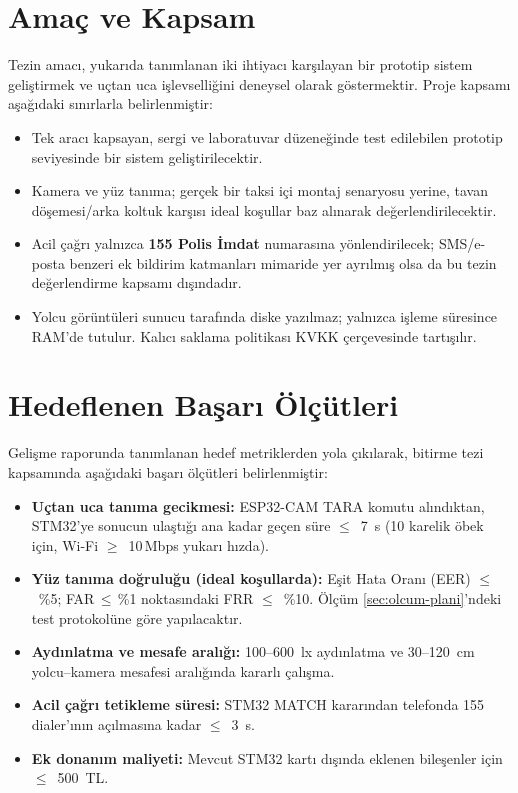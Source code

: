 \section{Amaç ve Kapsam}

Tezin amacı, yukarıda tanımlanan iki ihtiyacı karşılayan bir prototip
sistem geliştirmek ve uçtan uca işlevselliğini deneysel olarak
göstermektir. Proje kapsamı aşağıdaki sınırlarla belirlenmiştir:

\begin{itemize}
    \item Tek aracı kapsayan, sergi ve laboratuvar düzeneğinde test
          edilebilen prototip seviyesinde bir sistem geliştirilecektir.
    \item Kamera ve yüz tanıma; gerçek bir taksi içi montaj senaryosu
          yerine, tavan döşemesi/arka koltuk karşısı ideal koşullar
          baz alınarak değerlendirilecektir.
    \item Acil çağrı yalnızca \textbf{155 Polis İmdat} numarasına
          yönlendirilecek; SMS/e-posta benzeri ek bildirim katmanları
          mimaride yer ayrılmış olsa da bu tezin değerlendirme
          kapsamı dışındadır.
    \item Yolcu görüntüleri sunucu tarafında diske yazılmaz; yalnızca
          işleme süresince RAM'de tutulur. Kalıcı saklama politikası
          KVKK çerçevesinde tartışılır.
\end{itemize}

\section{Hedeflenen Başarı Ölçütleri}
\label{sec:hedefler}

Gelişme raporunda \cite{ekin_gelisme_2026} tanımlanan hedef metriklerden
yola çıkılarak, bitirme tezi kapsamında aşağıdaki başarı ölçütleri
belirlenmiştir:

\begin{itemize}
    \item \textbf{Uçtan uca tanıma gecikmesi:} ESP32-CAM TARA komutu
          alındıktan, STM32'ye sonucun ulaştığı ana kadar geçen süre
          $\leq$~7~s (10 karelik öbek için, Wi-Fi $\geq$~10\,Mbps yukarı
          hızda).
    \item \textbf{Yüz tanıma doğruluğu (ideal koşullarda):}
          Eşit Hata Oranı (EER) $\leq$~\%5; FAR\,$\leq$\,\%1 noktasındaki
          FRR $\leq$~\%10. Ölçüm \ref{sec:olcum-plani}'ndeki test
          protokolüne göre yapılacaktır.
    \item \textbf{Aydınlatma ve mesafe aralığı:} 100--600~lx aydınlatma ve
          30--120~cm yolcu--kamera mesafesi aralığında kararlı çalışma.
    \item \textbf{Acil çağrı tetikleme süresi:} STM32 MATCH kararından
          telefonda 155 dialer'ının açılmasına kadar $\leq$~3~s.
    \item \textbf{Ek donanım maliyeti:} Mevcut STM32 kartı dışında
          eklenen bileşenler için $\leq$~500~TL.
\end{itemize}

